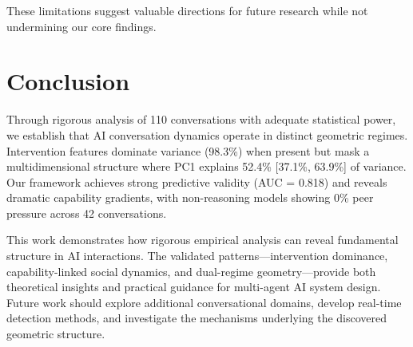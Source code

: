 \documentclass[11pt,letterpaper]{article}
\newcommand{\totalConversations}{110}
\newcommand{\nonReasoningCount}{42}
\newcommand{\allFeaturesPCOne}{98.3\%}  %
\newcommand{\nonInterventionPCOneVariance}{52.4\%}  %
\newcommand{\nonInterventionPCOneCILower}{37.1\%}
\newcommand{\nonInterventionPCOneCIUpper}{63.9\%}
\newcommand{\testAUC}{0.818}
\begin{document}
These limitations suggest valuable directions for future research while not undermining our core findings.

\section{Conclusion}

Through rigorous analysis of \totalConversations{} conversations with adequate statistical power, we establish that AI conversation dynamics operate in distinct geometric regimes. Intervention features dominate variance (\allFeaturesPCOne{}) when present but mask a multidimensional structure where PC1 explains \nonInterventionPCOneVariance{} [\nonInterventionPCOneCILower{}, \nonInterventionPCOneCIUpper{}] of variance. Our framework achieves strong predictive validity (AUC = \testAUC{}) and reveals dramatic capability gradients, with non-reasoning models showing 0\% peer pressure across \nonReasoningCount{} conversations.

This work demonstrates how rigorous empirical analysis can reveal fundamental structure in AI interactions. The validated patterns—intervention dominance, capability-linked social dynamics, and dual-regime geometry—provide both theoretical insights and practical guidance for multi-agent AI system design. Future work should explore additional conversational domains, develop real-time detection methods, and investigate the mechanisms underlying the discovered geometric structure.



\end{document}
